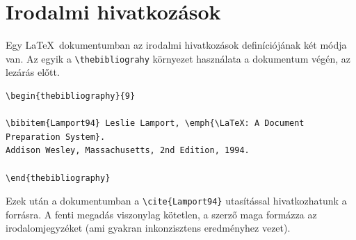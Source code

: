 \section{Irodalmi hivatkozások}\label{sect:HowtoReference}
Egy \LaTeX~dokumentumban az irodalmi hivatkozások definíciójának két módja van. Az egyik a \verb+\thebibliograhy+ környezet használata a dokumentum végén, az \verb++ lezárás előtt.
\begin{lstlisting}
\begin{thebibliography}{9}

\bibitem{Lamport94} Leslie Lamport, \emph{\LaTeX: A Document Preparation System}. 
Addison Wesley, Massachusetts, 2nd Edition, 1994.

\end{thebibliography}
\end{lstlisting}

Ezek után a dokumentumban a \verb+\cite{Lamport94}+ utasítással hivatkozhatunk a forrásra. A fenti megadás viszonylag kötetlen, a szerző maga formázza az irodalomjegyzéket (ami gyakran inkonzisztens eredményhez vezet). 

